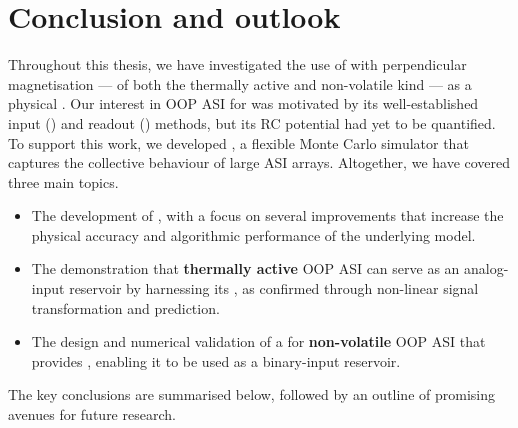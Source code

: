 \chapter{Conclusion and outlook}\label{ch:Conclusion}

Throughout this thesis, we have investigated the use of  with perpendicular magnetisation --- of both the thermally active and non-volatile kind --- as a physical .
Our interest in OOP ASI for  was motivated by its well-established input () and readout () methods, but its RC potential had yet to be quantified.
To support this work, we developed \hotspice, a flexible Monte Carlo simulator that captures the collective behaviour of large ASI arrays.
Altogether, we have covered three main topics.
\begin{itemize}
	\item The development of \textbf{\hotspice}, with a focus on several improvements that increase the physical accuracy and algorithmic performance of the underlying model.
	\item The demonstration that \textbf{thermally active} OOP ASI can serve as an analog-input reservoir by harnessing its , as confirmed through non-linear signal transformation and prediction.
	\item The design and numerical validation of a  for \textbf{non-volatile} OOP ASI that provides , enabling it to be used as a binary-input reservoir.
\end{itemize}
The key conclusions are summarised below, followed by an outline of promising avenues for future research.

\newpage
